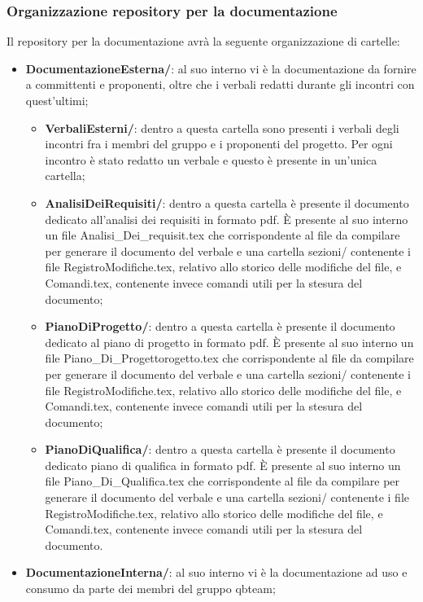 \subsubsection{Organizzazione repository per la documentazione}
Il repository per la documentazione avrà la seguente organizzazione di cartelle:
\begin{itemize}
	\item \textbf{DocumentazioneEsterna/}: al suo interno vi è la documentazione da fornire a committenti e proponenti, oltre che i verbali redatti durante gli incontri con quest'ultimi;
	\begin{itemize}
		\item \textbf{VerbaliEsterni/}: dentro a questa cartella sono presenti i verbali degli incontri fra i membri del gruppo e i proponenti del progetto. Per ogni incontro è stato redatto un verbale e questo è presente in un'unica cartella;
		\item \textbf{AnalisiDeiRequisiti/}: dentro a questa cartella è presente il documento dedicato all’analisi dei requisiti in formato pdf. È presente al suo interno un file Analisi\_Dei\_requisit.tex che corrispondente al file da compilare per generare il documento del verbale e una cartella sezioni/ contenente i file RegistroModifiche.tex, relativo allo storico delle modifiche del file, e Comandi.tex, contenente invece comandi utili per la stesura del documento;
		\item \textbf{PianoDiProgetto/}: dentro a questa cartella è presente il documento dedicato al piano di progetto in formato pdf. È presente al suo interno un file Piano\_Di\_Progettorogetto.tex che corrispondente al file da compilare per generare il documento del verbale e una cartella sezioni/ contenente i file RegistroModifiche.tex, relativo allo storico delle modifiche del file, e Comandi.tex, contenente invece comandi utili per la stesura del documento;
		\item \textbf{PianoDiQualifica/}: dentro a questa cartella è presente il documento dedicato piano di qualifica in formato pdf. È presente al suo interno un file Piano\_Di\_Qualifica.tex che corrispondente al file da compilare per generare il documento del verbale e una cartella sezioni/ contenente i file RegistroModifiche.tex, relativo allo storico delle modifiche del file, e Comandi.tex, contenente invece comandi utili per la stesura del documento.
	\end{itemize}
	\item \textbf{DocumentazioneInterna/}: al suo interno vi è la documentazione ad uso e consumo da parte dei membri del gruppo qbteam;

\end{itemize}
